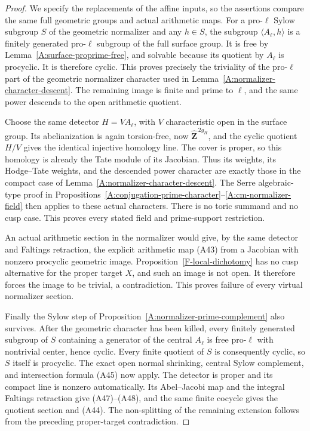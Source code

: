 \documentclass[11pt,oneside]{article}
\begin{document}
\begin{proof}
We specify the replacements of the affine
inputs, so the assertions compare the same
full geometric groups and actual arithmetic
maps. For a pro-$\ell$ Sylow subgroup $S$
of the geometric normalizer and any $h\in S$,
the subgroup $\langle A_\ell,h\rangle$ is a
finitely generated pro-$\ell$ subgroup of the
full surface group. It is free by
Lemma~\ref{A:surface-proprime-free}, and
solvable because its quotient by $A_\ell$
is procyclic. It is therefore cyclic.
This proves precisely the triviality of the
pro-$\ell$ part of the geometric normalizer
character used in
Lemma~\ref{A:normalizer-character-descent}.
The remaining image is finite and prime to
$\ell$, and the same power descends to the
open arithmetic quotient.

Choose the same detector $H=V A_\ell$, with
$V$ characteristic open in the surface group.
Its abelianization is again torsion-free,
now $\widehat{\mathbf Z}^{\,2g_H}$, and the
cyclic quotient $H/V$ gives the identical
injective homology line. The cover is proper,
so this homology is already the Tate module
of its Jacobian. Thus its weights, its
Hodge--Tate weights, and the descended power
character are exactly those in the compact
case of Lemma~\ref{A:normalizer-character-descent}.
The Serre algebraic-type proof in
Propositions~\ref{A:conjugation-prime-character}--\ref{A:cm-normalizer-field}
then applies to these actual characters.
There is no toric summand and no cusp case.
This proves every stated field and prime-support
restriction.

An actual arithmetic section in the normalizer
would give, by the same detector and Faltings
retraction, the explicit arithmetic map
(A43) from a Jacobian with nonzero procyclic
geometric image. Proposition~\ref{F-local-dichotomy}
has no cusp alternative for the proper
target $X$, and such an image is not open.
It therefore forces the image to be trivial,
a contradiction. This proves failure of
every virtual normalizer section.

Finally the Sylow step of
Proposition~\ref{A:normalizer-prime-complement}
also survives. After the geometric character
has been killed, every finitely generated
subgroup of $S$ containing a generator of
the central $A_\ell$ is free pro-$\ell$ with
nontrivial center, hence cyclic. Every finite
quotient of $S$ is consequently cyclic,
so $S$ itself is procyclic. The exact open
normal shrinking, central Sylow complement,
and intersection formula (A45) now apply.
The detector is proper and its compact line
is nonzero automatically. Its Abel--Jacobi
map and the integral Faltings retraction
give (A47)--(A48), and the same finite
cocycle gives the quotient section and
(A44). The non-splitting of the remaining
extension follows from the preceding
proper-target contradiction.
\end{proof}
\end{document}
